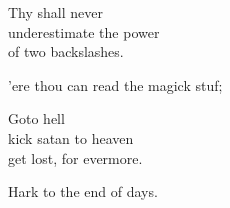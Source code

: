\documentclass{article}
\begin{document}
Thy shall never \\
underestimate the power \\
of two backslashes.

'ere thou can read the magick stuf;
\begin{center} 

Goto hell\\
kick satan to heaven\\
get lost, for evermore.

\end{center}
Hark to the end of days.
\end{document}
